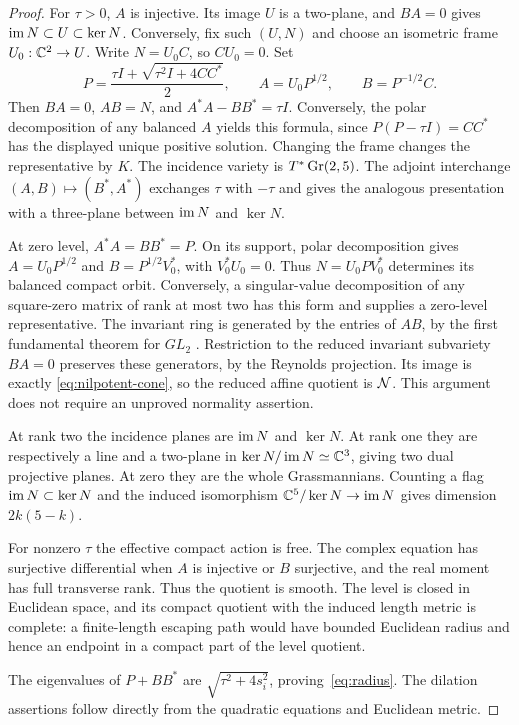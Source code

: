 \begin{proof}
For $\tau>0$, $A$ is injective. Its image $U$ is a two-plane, and
$BA=0$ gives
$\operatorname{im} N\subset U\subset\ker N$. Conversely, fix such $(U,N)$ and choose
an isometric frame $U_0:\mathbb C^2\to U$. Write $N=U_0C$, so $CU_0=0$.
Set
\begin{equation}\label{eq:positive-representative}
P=\frac{\tau I+\sqrt{\tau^2I+4CC^*}}2,\qquad
A=U_0P^{1/2},\qquad B=P^{-1/2}C.
\end{equation}
Then $BA=0$, $AB=N$, and $A^*A-BB^*=\tau I$.
Conversely, the polar decomposition of any balanced $A$ yields this
formula, since $P(P-\tau I)=CC^*$ has the displayed unique positive
solution. Changing the frame changes the representative by $K$.
The incidence variety is $T^*\operatorname{Gr}(2,5)$.
The adjoint interchange $(A,B)\mapsto(B^*,A^*)$ exchanges $\tau$ with
$-\tau$ and gives the analogous presentation with a three-plane
between $\operatorname{im} N$ and $\ker N$.

At zero level, $A^*A=BB^*=P$. On its support, polar decomposition gives
$A=U_0P^{1/2}$ and $B=P^{1/2}V_0^*$, with $V_0^*U_0=0$.
Thus $N=U_0PV_0^*$ determines its balanced compact orbit. Conversely,
a singular-value decomposition of any square-zero matrix of rank at
most two has this form and supplies a zero-level representative.
The invariant ring is generated by the entries of $AB$, by the first
fundamental theorem for $GL_2$ \cite[\S2.1--2.2]{KP96}.
Restriction to the reduced invariant subvariety $BA=0$ preserves these
generators, by the Reynolds projection. Its image is exactly
\eqref{eq:nilpotent-cone}, so the reduced affine quotient is $\mathcal N$.
This argument does not require an unproved normality assertion.

At rank two the incidence planes are $\operatorname{im} N$ and $\ker N$.
At rank one they are respectively a line and a two-plane in
$\ker N/\operatorname{im} N\simeq\mathbb C^3$, giving two dual projective planes.
At zero they are the whole Grassmannians. Counting a flag
$\operatorname{im} N\subset\ker N$ and the induced isomorphism
$\mathbb C^5/\ker N\to\operatorname{im} N$ gives dimension $2k(5-k)$.

For nonzero $\tau$ the effective compact action is free. The complex
equation has surjective differential when $A$ is injective or $B$
surjective, and the real moment has full transverse rank. Thus the
quotient is smooth. The level is closed in Euclidean space, and its
compact quotient with the induced length metric is complete: a
finite-length escaping path would have bounded Euclidean radius and
hence an endpoint in a compact part of the level quotient.

The eigenvalues of $P+BB^*$ are
$\sqrt{\tau^2+4s_i^2}$, proving~\eqref{eq:radius}. The dilation
assertions follow directly from the quadratic equations and Euclidean
metric.
\end{proof}

